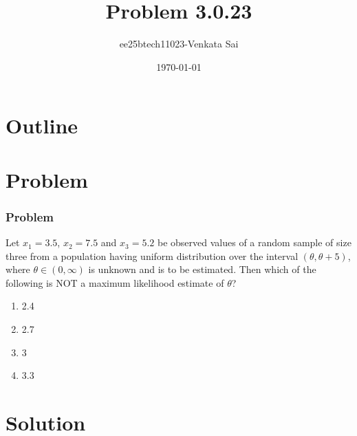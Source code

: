 \documentclass{beamer}
\title{Problem 3.0.23}
\author{ee25btech11023-Venkata Sai}
\date{\today}
\theoremstyle{remark}
\numberwithin{equation}{section}
\begin{document}
\begin{frame}
\titlepage
\end{frame}

\section*{Outline}
\begin{frame}
\tableofcontents
\end{frame}

\section{Problem}

\begin{frame}
\frametitle{Problem}
Let $x_1 = 3.5$, $x_2 = 7.5$ and $x_3 = 5.2$ be observed values of a random sample of size 
three from a population having uniform distribution over the interval $(\theta, \theta + 5)$, 
where $\theta \in (0, \infty)$ is unknown and is to be estimated. Then which of the 
following is NOT a maximum likelihood estimate of $\theta$?

\begin{enumerate}
    \item 2.4
    \item 2.7
    \item 3
    \item 3.3
\end{enumerate}
\end{frame}
\section{Solution}
\end{document}

